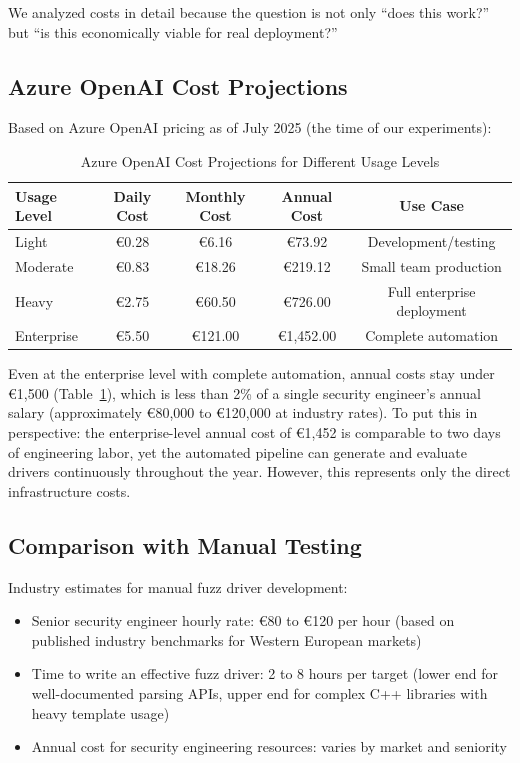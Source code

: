 We analyzed costs in detail because the question is not only ``does this work?'' but ``is this economically viable for real deployment?''

\subsection{Azure OpenAI Cost Projections}
\label{sec:results_cost_azure}

Based on Azure OpenAI pricing as of July 2025 (the time of our experiments):

\begin{table}[htbp]
\centering
\caption{Azure OpenAI Cost Projections for Different Usage Levels}
\label{tab:cost_scenarios}
\small
\begin{tabular}{lcccc}
\toprule
Usage Level & Daily Cost & Monthly Cost & Annual Cost & Use Case \\
\midrule
Light & \euro{}0.28 & \euro{}6.16 & \euro{}73.92 & Development/testing \\
Moderate & \euro{}0.83 & \euro{}18.26 & \euro{}219.12 & Small team production \\
Heavy & \euro{}2.75 & \euro{}60.50 & \euro{}726.00 & Full enterprise deployment \\
Enterprise & \euro{}5.50 & \euro{}121.00 & \euro{}1,452.00 & Complete automation \\
\bottomrule
\end{tabular}
\end{table}

Even at the enterprise level with complete automation, annual costs stay under \euro{}1,500 (Table~\ref{tab:cost_scenarios}), which is less than 2\% of a single security engineer's annual salary (approximately \euro{}80,000 to \euro{}120,000 at industry rates). To put this in perspective: the enterprise-level annual cost of \euro{}1,452 is comparable to two days of engineering labor, yet the automated pipeline can generate and evaluate drivers continuously throughout the year. However, this represents only the direct infrastructure costs.


\subsection{Comparison with Manual Testing}
\label{sec:results_cost_manual}

Industry estimates for manual fuzz driver development:
\begin{itemize}
    \item Senior security engineer hourly rate: \euro{}80 to \euro{}120 per hour (based on published industry benchmarks for Western European markets)
    \item Time to write an effective fuzz driver: 2 to 8 hours per target (lower end for well-documented parsing APIs, upper end for complex C++ libraries with heavy template usage)
    \item Annual cost for security engineering resources: varies by market and seniority
\end{itemize}

